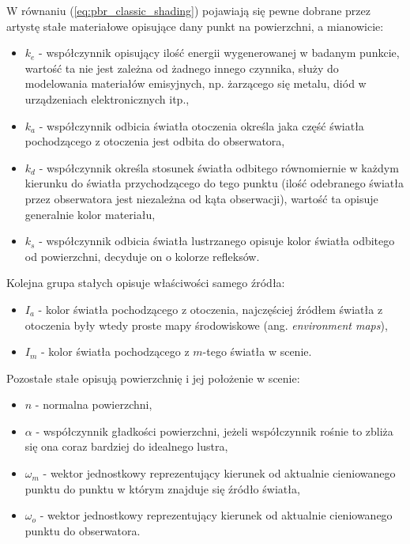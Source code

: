\documentclass[../main.tex]{subfiles}
\begin{document}
W równaniu (\ref{eq:pbr_classic_shading}) pojawiają się pewne dobrane przez artystę stałe materiałowe opisujące dany punkt na powierzchni, a mianowicie:

\begin{itemize}

\item $k_e$ - współczynnik opisujący ilość energii wygenerowanej w badanym punkcie, wartość ta nie jest zależna od żadnego innego czynnika, służy do modelowania materiałów emisyjnych, np. żarzącego się metalu, diód w urządzeniach elektronicznych itp.,

\item $k_a$ - współczynnik odbicia światła otoczenia określa jaka część światła pochodzącego z otoczenia jest odbita do obserwatora, 

\item $k_d$ - współczynnik określa stosunek światła odbitego równomiernie w każdym kierunku do światła przychodzącego do tego punktu (ilość odebranego światła przez obserwatora jest niezależna od kąta obserwacji), wartość ta opisuje generalnie kolor materiału,

\item $k_s$ - współczynnik odbicia światła lustrzanego opisuje kolor światła odbitego od powierzchni, decyduje on o kolorze refleksów.

\end{itemize}

\noindent Kolejna grupa stałych opisuje właściwości samego źródła:

\begin{itemize}
    \item $I_a$ - kolor światła pochodzącego z otoczenia, najczęściej źródłem światła z otoczenia były wtedy proste mapy środowiskowe (ang. \textit{environment maps}),
    \item $I_m$ - kolor światła pochodzącego z $m$-tego światła w scenie.
\end{itemize}

\noindent Pozostałe stałe opisują powierzchnię i jej położenie w scenie:

\begin{itemize}
    \item $n$ - normalna powierzchni,
    \item $\alpha$ - współczynnik gładkości powierzchni, jeżeli współczynnik rośnie to zbliża się ona coraz bardziej do idealnego lustra,
    \item $\omega_m$ - wektor jednostkowy reprezentujący kierunek od aktualnie cieniowanego punktu do punktu w którym znajduje się źródło światła,
    \item $\omega_o$ - wektor jednostkowy reprezentujący kierunek od aktualnie cieniowanego punktu do obserwatora.
\end{itemize}
\end{document}
